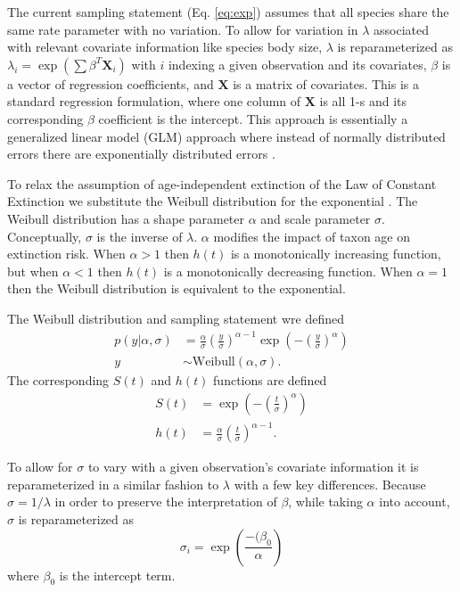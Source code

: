 \documentclass{article}
\begin{document}
The current sampling statement (Eq. \ref{eq:exp}) assumes that all species share the same rate parameter with no variation. To allow for variation in \(\lambda\) associated with relevant covariate information like species body size, \(\lambda\) is reparameterized as \(\lambda_{i} = \exp(\sum \beta^{T}\mathbf{X}_{i})\) with \(i\) indexing a given observation and its covariates, \(\beta\) is a vector of regression coefficients, and \(\mathbf{X}\) is a matrix of covariates. This is a standard regression formulation, where one column of \(\mathbf{X}\) is all 1-s and its corresponding \(\beta\) coefficient is the intercept. This approach is essentially a generalized linear model (GLM) approach where instead of normally distributed errors there are exponentially distributed errors \cite{Klein2003}.

To relax the assumption of age-independent extinction of the Law of Constant Extinction we substitute the Weibull distribution for the exponential \cite{Klein2003}. The Weibull distribution has a shape parameter \(\alpha\) and scale parameter \(\sigma\). Conceptually, \(\sigma\) is the inverse of \(\lambda\). \(\alpha\) modifies the impact of taxon age on extinction risk. When \(\alpha > 1\) then \(h(t)\) is a monotonically increasing function, but when \(\alpha < 1\) then \(h(t)\) is a monotonically decreasing function. When \(\alpha = 1\) then the Weibull distribution is equivalent to the exponential.

The Weibull distribution and sampling statement wre defined
\begin{align}
  p(y | \alpha, \sigma) &= \frac{\alpha}{\sigma} \left(\frac{y}{\sigma}\right)^{\alpha - 1} \exp\left(-\left(\frac{y}{\sigma}\right)^{\alpha}\right) \nonumber \\
  y &\sim \mathrm{Weibull}(\alpha, \sigma).
  \label{eq:weibull}
\end{align}
The corresponding \(S(t)\) and \(h(t)\) functions are defined
\begin{align}
  S(t) &= \exp\left(-\left(\frac{t}{\sigma}\right)^{\alpha}\right) \label{eq:wei_surv} \\
  h(t) &= \frac{\alpha}{\sigma}\left(\frac{t}{\sigma}\right)^{\alpha - 1} \label{eq:wei_haz}.
\end{align}

To allow for \(\sigma\) to vary with a given observation's covariate information it is reparameterized in a similar fashion to \(\lambda\) with a few key differences. Because \(\sigma = 1/\lambda\) in order to preserve the interpretation of \(\beta\), while taking \(\alpha\) into account, \(\sigma\) is reparameterized as
\begin{equation}
  \sigma_{i} = \exp\left(\frac{-(\beta_{0}}{\alpha}\right)
  \label{eq:reg}
\end{equation}
where \(\beta_{0}\) is the intercept term.
\end{document}
